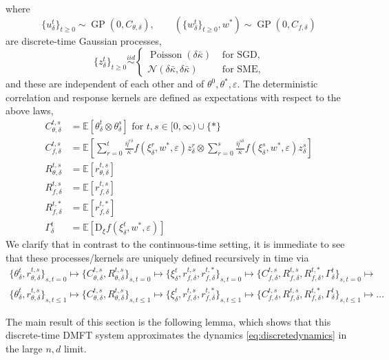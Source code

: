 \documentclass[11pt,letterpaper,reqno]{amsart}
\theoremstyle{definition}
\def\eps{\varepsilon}
\def\D{\mathrm{D}}
\def\E{\mathbb{E}}
\def\Pois{\operatorname{Poisson}}
\def\GP{\operatorname{GP}}
\def\cN{\mathcal{N}}
\newcommand{\brk}[1]{\left[{#1}\right]} %
\begin{document}
where
\[\{u_\delta^t\}_{t \geq 0} \sim \GP(0,C_{\theta,\delta}),
\qquad (\{w_\delta^t\}_{t \geq 0},w^*) \sim \GP(0,C_{f,\delta})\]
are discrete-time Gaussian processes,
\[\{z_\delta^t\}_{t \geq 0} \overset{iid}{\sim} \begin{cases}
\Pois(\delta\bar\kappa) & \text{ for SGD}, \\
\cN(\delta\bar\kappa,\delta\bar\kappa) & \text{ for SME},
\end{cases}\]
and these are independent of each other and of $\theta^0,\theta^*,\eps$.
The deterministic correlation and response kernels are defined as
expectations with respect to the above laws,
\begin{align}
C_{\theta,\delta}^{t,s}&=\E[\theta^t_\delta \otimes \theta^s_\delta] \text{ for } t,s \in [0,\infty)
\cup \{*\}\label{eq:def-dis-C-t}\\
C_{f,\delta}^{t,s}&=\E\brk{\sum_{r=0}^t \frac{\bar\eta^{r\delta}}{\bar\kappa}
f(\xi_\delta^r,w^*,\eps)z^r_\delta
\otimes \sum_{r=0}^s \frac{\bar\eta^{s\delta}}{\bar\kappa}
f(\xi_\delta^s,w^*,\eps)z^s_\delta}\label{eq:def-dis-C-h}\\
 R_{\theta,\delta}^{t,s}&=\E[ r_{\theta,\delta}^{t,s}]
\label{eq:def-dis-R-t}\\
R_{f,\delta}^{t,s}&=\E[r_{f,\delta}^{t,s}]\label{eq:def-dis-R-h}\\
R_{f,\delta}^{t,*}&=\E[ r_{f,\delta}^{t,*}]
\label{eq:def-dis-R-h-star}\\
\Gamma^t_\delta&=\E[\D_\xi f(\xi^t_\delta,w^*,\eps)]\label{eq:def-dis-Gamma}
\end{align}
We clarify that in contrast to the continuous-time setting, it is immediate to
see that these processes/kernels are uniquely defined recursively in time via
\[\begin{gathered}
\{\theta_\delta^t,r_{\theta,\delta}^{t,s}\}_{s,t=0}
\mapsto \{C_{\theta,\delta}^{t,s},R_{\theta,\delta}^{t,s}\}_{s,t=0}
\mapsto \{\xi_\delta^t,r_{f,\delta}^{t,s},r_{f,\delta}^{t,*}\}_{s,t=0}
\mapsto
\{C_{f,\delta}^{t,s},R_{f,\delta}^{t,s},R_{f,\delta}^{t,*},\Gamma_\delta^t\}_{s,t=0}
\mapsto\\
\{\theta_\delta^t,r_{\theta,\delta}^{t,s}\}_{s,t \leq 1}
\mapsto \{C_{\theta,\delta}^{t,s},R_{\theta,\delta}^{t,s}\}_{s,t \leq 1}
\mapsto \{\xi_\delta^t,r_{f,\delta}^{t,s},r_{f,\delta}^{t,*}\}_{s,t \leq 1}
\mapsto
\{C_{f,\delta}^{t,s},R_{f,\delta}^{t,s},R_{f,\delta}^{t,*},\Gamma_\delta^t\}_{s,t \leq 1} \mapsto \ldots
\end{gathered}\]

The main result of this section is the following lemma, which shows that
this discrete-time DMFT system approximates the dynamics
\eqref{eq:discretedynamics} in the large $n,d$ limit.
\end{document}
